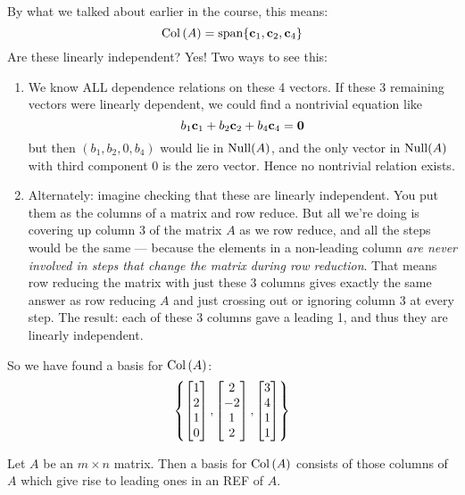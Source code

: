 \begin{myprob}
\begin{mysol}
By what we talked about earlier in the course, this means:
$$
\operatorname{Col\,}(A) = \textrm{span}\{ \mathbf{c}_1, \mathbf{c}_2, \mathbf{c}_4\}
$$
Are these linearly independent?  Yes!  Two ways to see this:
\begin{enumerate}
\item We know ALL dependence relations on these 4 vectors.  If these
3 remaining vectors were linearly dependent, we could find a
nontrivial equation like
$$
b_1 \mathbf{c}_1 + b_2\mathbf{c}_2 + b_4 \mathbf{c}_4 = \mathbf{0}
$$
but then $(b_1, b_2, 0, b_4)$ would lie in $\operatorname{Null}(A)$, and the only
vector in $\operatorname{Null}(A)$ with third component 0 is the zero vector.  Hence
no nontrivial relation exists.
\item Alternately:  imagine checking that these are linearly independent.  You put
them as the columns of a matrix and row reduce.  But all we're doing
is covering up column 3 of the matrix $A$ as we row reduce, and all
the steps would be the same --- because the elements in a non-leading
column {\it are never involved in   steps that change the matrix during  row reduction}.  That
means row reducing the matrix with just these 3 columns gives exactly
the same answer as row reducing $A$ and just crossing out or ignoring
column 3 at every step.  The result:  each of these 3 columns gave
a leading 1, and thus they are linearly independent.
\end{enumerate}

So we have found a basis for $\operatorname{Col\,}(A)$:
$$
\left\{ \left[ \begin{matrix} 1\\2\\1\\0 \end{matrix} \right], \left[ \begin{matrix} 2\\-2\\1\\2 \end{matrix} \right], \left[ \begin{matrix} 3\\4\\1\\1 \end{matrix} \right] \right\}
$$
\end{mysol}\end{myprob}

\begin{theorem}
Let $A$ be an $m\times n$ matrix.  Then a basis for $\operatorname{Col\,}(A)$ consists of
those columns of $A$ which give rise to leading ones in an REF of $A$.
\end{theorem}

